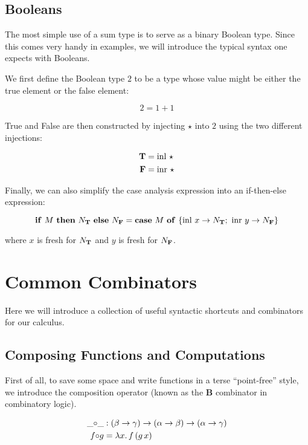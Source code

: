 \subsection{Booleans}

The most simple use of a sum type is to serve as a binary Boolean
type. Since this comes very handy in examples, we will introduce the
typical syntax one expects with Booleans.

We first define the Boolean type $2$ to be a type whose value might be
either the true element or the false element:

$$
2 = 1 + 1
$$

True and False are then constructed by injecting $\star$ into $2$ using the
two different injections:

\begin{align*}
  \textbf{T} &= \operatorname{inl}\,\star \\
  \textbf{F} &= \operatorname{inr}\,\star
\end{align*}

Finally, we can also simplify the case analysis expression into an
if-then-else expression:

$$
\text{\textbf{if} $M$ \textbf{then} $N_{\textbf{T}}$ \textbf{else} $N_{\textbf{F}}$} = \text{\textbf{case} $M$ \textbf{of} $\{ \operatorname{inl}\,x \to N_{\textbf{T}};\ \operatorname{inr}\,y \to N_{\textbf{F}} \}$}
$$

where $x$ is fresh for $N_{\textbf{T}}$ and $y$ is fresh for $N_{\textbf{F}}$.

\section{Common Combinators}
\label{sec:common-combinators}

Here we will introduce a collection of useful syntactic shortcuts and
combinators for our calculus.

\subsection{Composing Functions and Computations}
\label{ssec:composing-functions}

First of all, to save some space and write functions in a terse
``point-free'' style, we introduce the composition operator (known as the
$\textbf{B}$ combinator in combinatory logic).

\begin{align*}
  \_ {\mathbin{\circ}} \_ &: (\beta \to \gamma) \to (\alpha \to \beta) \to (\alpha \to \gamma) \\
  f {\mathbin{\circ}} g &= \lambda x.\, f\,(g\,x)
\end{align*}

